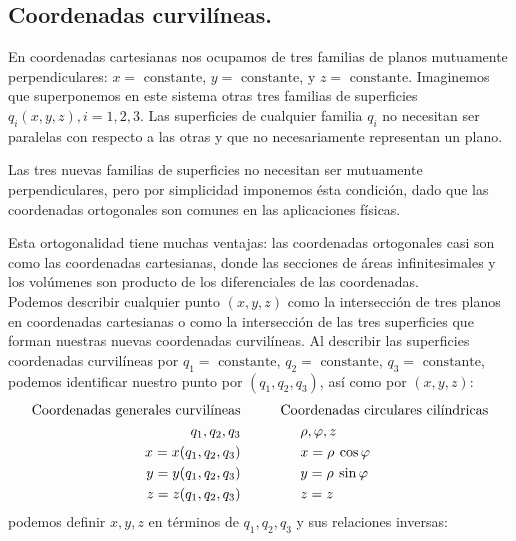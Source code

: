 \subsection{Coordenadas curvilíneas.}
En coordenadas cartesianas nos ocupamos de tres familias de planos mutuamente perpendiculares: $x = \mbox{ constante}$, $y = \mbox{ constante}$, y $z = \mbox{ constante}$. Imaginemos que superponemos en este sistema otras tres familias de superficies $q_{i} (x, y, z), i = 1,2,3$. Las superficies de cualquier familia $q_{i}$ no necesitan ser paralelas con respecto a las otras  y que no necesariamente representan un plano.
\par
Las tres nuevas familias de superficies no necesitan ser mutuamente perpendiculares, pero por simplicidad imponemos ésta condición, dado que las coordenadas ortogonales son comunes en las aplicaciones físicas.
\par
Esta ortogonalidad tiene muchas ventajas: las coordenadas ortogonales casi son como las coordenadas cartesianas, donde las secciones de áreas infinitesimales y los volúmenes son producto de los diferenciales de las coordenadas.
\\
Podemos describir cualquier punto $(x, y, z)$ como la intersección de tres planos en coordenadas cartesianas o como la intersección de las tres superficies que forman nuestras nuevas coordenadas curvilíneas. Al describir las superficies coordenadas curvilíneas por $q_{1} = \mbox{ constante}$, $q_{2} = \mbox{ constante}$, $q_{3} = \mbox{ constante}$, podemos identificar nuestro punto por $(q_{1}, q_{2}, q_{3})$, así como por $(x, y, z)$:
\begin{align}
\begin{aligned}
\mbox{Coordenadas  generales curvilíneas} & \hspace{1.cm} \mbox{Coordenadas circulares cilíndricas} \\
q_{1}, q_{2}, q_{3} & \hspace{1.5cm} \rho, \varphi, z \\ 
x = x(q_{1},q_{2}, q_{3}) & \hspace{1.5cm} x = \rho \: \cos \varphi \\ 
y = y(q_{1},q_{2}, q_{3}) & \hspace{1.5cm} y = \rho \: \sin \varphi \\
z = z(q_{1},q_{2}, q_{3}) & \hspace{1.5cm} z = z
\label{eq:ecuacion_02_01}
\end{aligned}
\end{align}
podemos definir $x, y, z$ en términos de $q_{1}, q_{2}, q_{3}$ y sus relaciones inversas:
